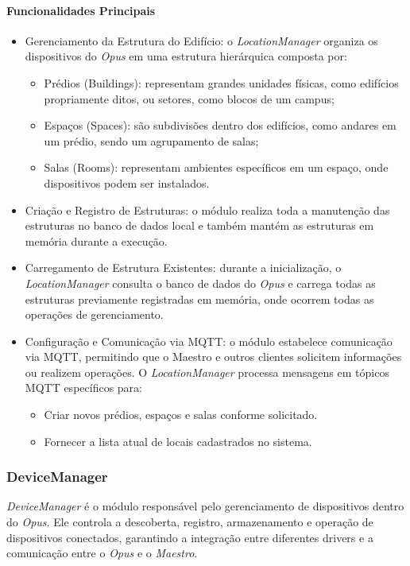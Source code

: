 \paragraph{Funcionalidades Principais}
\begin{itemize}
    \item Gerenciamento da Estrutura do Edifício: o \emph{LocationManager} organiza os dispositivos do \emph{Opus} 
    em uma estrutura hierárquica composta por:
    \begin{itemize}
        \item Prédios (Buildings): representam grandes unidades físicas, como edifícios propriamente ditos, ou setores, como blocos de um campus;
        \item Espaços (Spaces): são subdivisões dentro dos edifícios, como andares em um prédio, sendo um agrupamento de salas;
        \item Salas (Rooms): representam ambientes específicos em um espaço, onde dispositivos podem ser instalados.
    \end{itemize}
    \item Criação e Registro de Estruturas: o módulo realiza toda a manutenção das estruturas no banco de dados local e também mantém as estruturas 
        em memória durante a execução.
    \item Carregamento de Estrutura Existentes: durante a inicialização, o \emph{LocationManager} consulta o banco de dados do
        \emph{Opus} e carrega todas as estruturas previamente registradas em memória, onde ocorrem todas as operações de gerenciamento.
    \item Configuração e Comunicação via MQTT: o módulo estabelece comunicação via MQTT, permitindo que o Maestro e
        outros clientes solicitem informações ou realizem operações.
        O \emph{LocationManager} processa mensagens em tópicos MQTT específicos para:
    \begin{itemize}
        \item Criar novos prédios, espaços e salas conforme solicitado.
        \item Fornecer a lista atual de locais cadastrados no sistema.
    \end{itemize}
\end{itemize}

\subsubsection{DeviceManager}
\emph{DeviceManager} é o módulo responsável pelo gerenciamento de dispositivos dentro do \emph{Opus}.
Ele controla a descoberta, registro, armazenamento e operação de dispositivos conectados, garantindo a integração entre diferentes drivers
e a comunicação entre o \emph{Opus} e o \emph{Maestro}.

